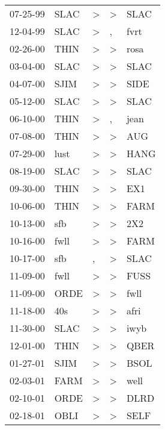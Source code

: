 \begin{supertabular}{lllll}
 07-25-99 &   SLAC &     \textgreater &     \textgreater &  SLAC \\
 12-04-99 &   SLAC &     \textgreater &                , &  fvrt \\
 02-26-00 &   THIN &     \textgreater &     \textgreater &  rosa \\
 03-04-00 &   SLAC &     \textgreater &     \textgreater &  SLAC \\
 04-07-00 &   SJIM &     \textgreater &     \textgreater &  SIDE \\
 05-12-00 &   SLAC &     \textgreater &     \textgreater &  SLAC \\
 06-10-00 &   THIN &     \textgreater &                , &  jean \\
 07-08-00 &   THIN &     \textgreater &     \textgreater &   AUG \\
 07-29-00 &   lust &     \textgreater &     \textgreater &  HANG \\
 08-19-00 &   SLAC &     \textgreater &     \textgreater &  SLAC \\
 09-30-00 &   THIN &     \textgreater &     \textgreater &   EX1 \\
 10-06-00 &   THIN &     \textgreater &     \textgreater &  FARM \\
 10-13-00 &    sfb &     \textgreater &     \textgreater &   2X2 \\
 10-16-00 &   fwll &     \textgreater &     \textgreater &  FARM \\
 10-17-00 &    sfb &                , &     \textgreater &  SLAC \\
 11-09-00 &   fwll &     \textgreater &     \textgreater &  FUSS \\
 11-09-00 &   ORDE &     \textgreater &     \textgreater &  fwll \\
 11-18-00 &    40s &     \textgreater &     \textgreater &  afri \\
 11-30-00 &   SLAC &     \textgreater &     \textgreater &  iwyb \\
 12-01-00 &   THIN &     \textgreater &     \textgreater &  QBER \\
 01-27-01 &   SJIM &     \textgreater &     \textgreater &  BSOL \\
 02-03-01 &   FARM &     \textgreater &     \textgreater &  well \\
 02-10-01 &   ORDE &     \textgreater &     \textgreater &  DLRD \\
 02-18-01 &   OBLI &     \textgreater &     \textgreater &  SELF \\

\end{supertabular}
